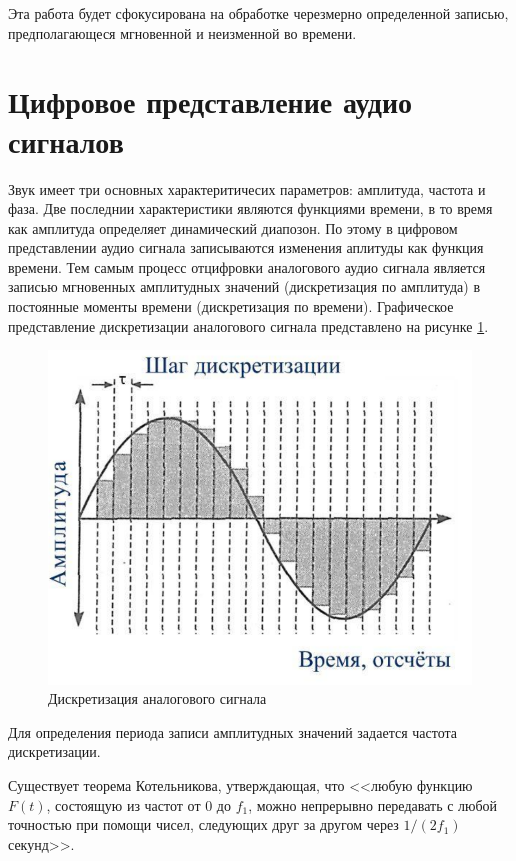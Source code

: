 Эта работа будет сфокусирована на обработке черезмерно определенной записью, предполагающеся мгновенной и неизменной во времени.

\section{Цифровое представление аудио сигналов}

Звук имеет три основных характеритичесих параметров: амплитуда, частота и фаза. Две последнии характеристики являются функциями времени, в то время как амплитуда определяет динамический диапозон. По этому в цифровом представлении аудио сигнала записываются изменения аплитуды как функция времени. Тем самым процесс отцифровки аналогового аудио сигнала является записью мгновенных амплитудных значений (дискретизация по амплитуда) в постоянные моменты времени (дискретизация по времени). Графическое представление дискретизации аналогового сигнала представлено на рисунке \ref{anal:atob}.

\begin{figure}
	\centering
	\includegraphics[width=\textwidth]{inc/img/analog-to-bin.png}
	\caption{Дискретизация аналогового сигнала}
	\label{anal:atob}
\end{figure}

Для определения периода записи амплитудных значений задается частота дискретизации. 

Существует теорема Котельникова\cite{Bikkenin}, утверждающая, что <<любую функцию $F(t)$, состоящую из частот от 0 до $f_1$, можно непрерывно передавать с любой точностью при помощи чисел, следующих друг за другом через $1/(2f_1)$ секунд>>.

